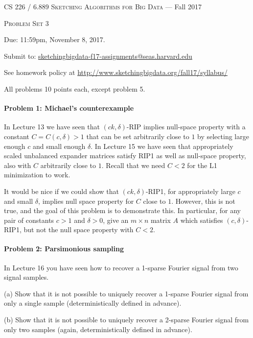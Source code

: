 \documentclass[12pt]{article}
\begin{document}
\thispagestyle{empty}

\begin{center}
{\Large \textsc{CS 226 / 6.889 Sketching Algorithms for Big Data} --- Fall 2017}

\bigskip

{\Large \textsc{Problem Set 3}}

\smallskip

Due: 11:59pm, November 8, 2017.

Submit to: \url{sketchingbigdata-f17-assignments@seas.harvard.edu}

\bigskip

{\footnotesize See homework policy at \url{http://www.sketchingbigdata.org/fall17/syllabus/}}
\end{center}

All problems 10 points each, except problem 5.

\paragraph{Problem 1: Michael's counterexample} In Lecture 13 we have seen that $(ck, \delta)$-RIP implies null-space property with a constant $C=C(c,\delta)> 1$ that can be set arbitrarily close to $1$ by selecting large enough $c$ and small enough $\delta$. In Lecture 15 we have seen that appropriately scaled unbalanced expander matrices satisfy RIP1 as well as null-space property, also with $C$ arbitrarily close to $1$. Recall that we need $C<2$ for the L1 minimization to work. 

It would be nice if we could show that $(ck, \delta)$-RIP1, for appropriately large $c$ and small $\delta$, implies null space property for $C$ close to $1$. However, this is not true, and the goal of this problem is to demonstrate this. In particular, for any pair of constants $c>1$ and $\delta>0$, give an $m \times n$ matrix $A$ which satisfies $(c, \delta)$-RIP1, but not the null  space property with $C<2$.


\paragraph{Problem 2: Parsimonious sampling} In Lecture 16 you have seen how to recover a 1-sparse Fourier signal from two signal samples. 

(a) Show that it is not possible to uniquely recover a 1-sparse Fourier signal from only a single sample (deterministically defined in advance).

(b) Show that it is not possible to uniquely recover a 2-sparse Fourier signal from only two samples (again, deterministically defined in advance).
\end{document}
